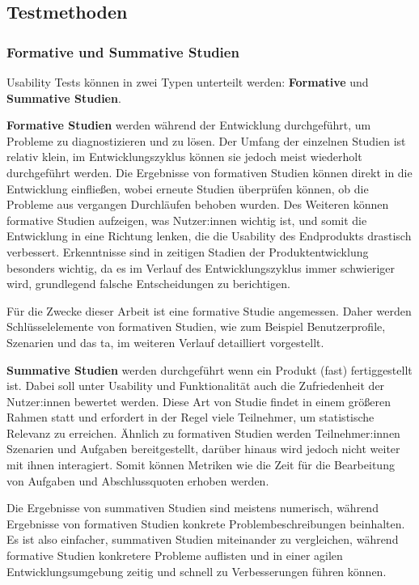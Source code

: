 
\subsection{Testmethoden}

\subsubsection{Formative und Summative Studien}
\label{section:formative-summative}
Usability Tests können in zwei Typen unterteilt werden: \textbf{Formative} und \textbf{Summative
  Studien}.

\textbf{Formative Studien} werden während der Entwicklung durchgeführt, um Probleme zu
diagnostizieren und zu lösen. Der Umfang der einzelnen Studien ist relativ klein, im
Entwicklungszyklus können sie jedoch meist wiederholt durchgeführt werden. Die Ergebnisse von
formativen Studien können direkt in die Entwicklung einfließen, wobei erneute Studien überprüfen
können, ob die Probleme aus vergangen Durchläufen behoben wurden. Des Weiteren können formative
Studien aufzeigen, was Nutzer:innen wichtig ist, und somit die Entwicklung in eine Richtung lenken,
die die Usability des Endprodukts drastisch verbessert. Erkenntnisse sind in zeitigen Stadien der
Produktentwicklung besonders wichtig, da es im Verlauf des Entwicklungszyklus immer schwieriger
wird, grundlegend falsche Entscheidungen zu berichtigen.

Für die Zwecke dieser Arbeit ist eine formative Studie angemessen. Daher werden Schlüsselelemente
von formativen Studien, wie zum Beispiel Benutzerprofile, Szenarien und das \acl{ta}, im weiteren
Verlauf detailliert vorgestellt.

\textbf{Summative Studien} werden durchgeführt wenn ein Produkt (fast) fertiggestellt ist. Dabei
soll unter Usability und Funktionalität auch die Zufriedenheit der Nutzer:innen bewertet werden.
Diese Art von Studie findet in einem größeren Rahmen statt und erfordert in der Regel viele
Teilnehmer, um statistische Relevanz zu erreichen. Ähnlich zu formativen Studien werden
Teilnehmer:innen Szenarien und Aufgaben bereitgestellt, darüber hinaus wird jedoch nicht weiter mit
ihnen interagiert. Somit können Metriken wie die Zeit für die Bearbeitung von Aufgaben und
Abschlussquoten erhoben werden.

Die Ergebnisse von summativen Studien sind meistens numerisch, während Ergebnisse von formativen
Studien konkrete Problembeschreibungen beinhalten. Es ist also einfacher, summativen Studien
miteinander zu vergleichen, während formative Studien konkretere Probleme auflisten und in einer
agilen Entwicklungsumgebung zeitig und schnell zu Verbesserungen führen können.

